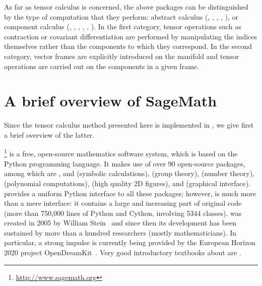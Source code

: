 As far as tensor calculus is concerned, the above packages can be distinguished by
the type of computation that they perform:
abstract calculus (, , ,
, ),
or component calculus (, , ,
, , ).
In the first category, tensor operations such as contraction or covariant differentiation
are performed by manipulating the indices themselves rather than the components
to which they correspond. In the second category, vector frames are explicitly
introduced on the manifold and tensor operations are carried out on the components
in a given frame.



\section{A brief overview of SageMath} \label{s:int:overview_Sage}

Since the tensor calculus method presented here is implemented in \Sage{}, we
give first a brief overview of the latter.

\Sage{}\footnote{\url{http://www.sagemath.org}} is a free, open-source mathematics software system, which is
based on the Python programming language. It makes use of over 90 open-source packages,
among which are ,  and  (symbolic calculations),
 (group theory),
 (number theory),  (polynomial computations),
 (high quality 2D figures), and  (graphical interface).
\Sage{} provides a uniform Python interface to all these packages; however,
\Sage{} is much more than a mere interface: it contains a large and increasing part of
original code (more than 750,000 lines of Python and Cython, involving 5344 classes).
\Sage{} was created in 2005 by William Stein~\cite{SteinJ05} and since
then its development has been sustained by more than a hundred researchers
(mostly mathematicians). In particular, a strong impulse is currently being
provided by the European Horizon 2020 project OpenDreamKit~\cite{OpenDreamKit}.
Very good introductory textbooks about \Sage{} are
\cite{JoyneS14,Zimme13,Zimme18,Bard15}.

